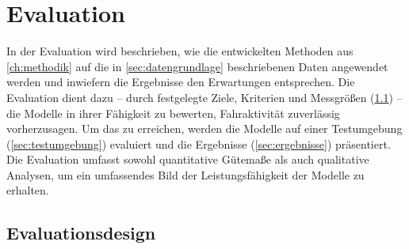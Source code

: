 \chapter{Evaluation}
\label{ch:evaluation}

In der Evaluation wird beschrieben, wie die entwickelten Methoden aus \cref{ch:methodik} auf die in \cref{sec:datengrundlage} beschriebenen Daten angewendet werden und inwiefern die Ergebnisse den Erwartungen entsprechen. Die Evaluation dient dazu -- durch festgelegte Ziele, Kriterien und Messgrößen (\cref{sec:evaluationsdesign}) -- die Modelle in ihrer Fähigkeit zu bewerten, Fahraktivität zuverlässig vorherzusagen. Um das zu erreichen, werden die Modelle auf einer Testumgebung (\cref{sec:testumgebung}) evaluiert und die Ergebnisse (\cref{sec:ergebnisse}) präsentiert. Die Evaluation umfasst sowohl quantitative Gütemaße als auch qualitative Analysen, um ein umfassendes Bild der Leistungsfähigkeit der Modelle zu erhalten. 

\section{Evaluationsdesign}
\label{sec:evaluationsdesign}

